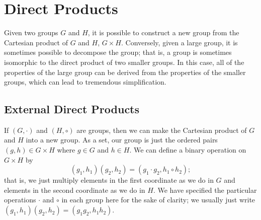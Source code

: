  

\section{Direct Products\quad
{}}\label{isomorph_section_2}

Given two groups $G$ and $H$, it is possible to construct a new group from the Cartesian product of $G$ and $H$, $G \times H$.  Conversely, given a large group, it is sometimes possible to decompose the group; that is, a group is sometimes isomorphic to the direct product of two smaller groups. In this case, all of the properties of the large group can be derived from the properties of the smaller groups, which can lead to tremendous simplification.
 
 
\subsection{External Direct Products}

If $(G,\cdot)$ and $(H, \circ)$ are groups, then we can make the Cartesian product of $G$ and $H$ into a new group.  As a set, our group is just the ordered pairs $(g, h) \in G \times H$ where $g \in G$ and $h \in H$. We can define a binary operation on $G \times H$ by 
\[
(g_1, h_1)(g_2, h_2) = (g_1 \cdot g_2, h_1 \circ h_2);
\]
that is, we just multiply elements in the first coordinate as we do in $G$ and elements in the second coordinate as we do in $H$.  We have specified the particular operations $\cdot$ and $\circ$ in each group here for the sake of clarity; we usually just write $(g_1, h_1)(g_2, h_2) = (g_1  g_2, h_1 h_2)$.  

